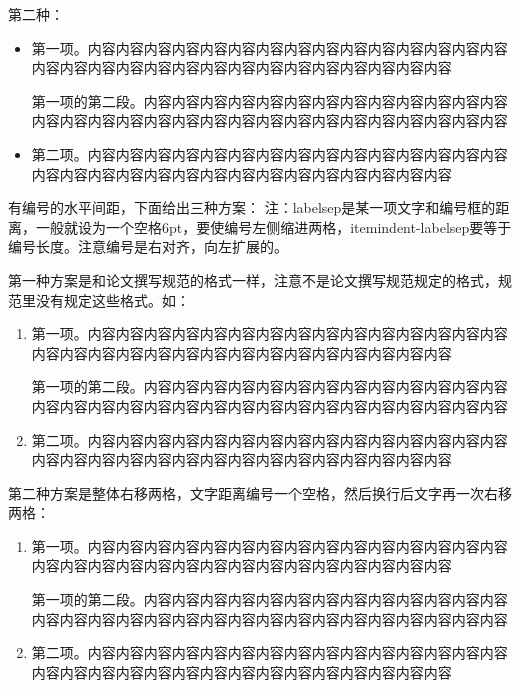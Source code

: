 第二种：
\begin{itemize}[topsep = 0 pt, itemsep= 0 pt, parsep=0pt, partopsep=0pt, leftmargin=36pt, itemindent=0pt, labelsep=6pt, listparindent=24pt]
	\item 第一项。内容内容内容内容内容内容内容内容内容内容内容内容内容内容内容内容内容内容内容内容内容内容内容内容内容内容内容内容内容内容

	第一项的第二段。内容内容内容内容内容内容内容内容内容内容内容内容内容内容内容内容内容内容内容内容内容内容内容内容内容内容内容内容内容内容
	\item 第二项。内容内容内容内容内容内容内容内容内容内容内容内容内容内容内容内容内容内容内容内容内容内容内容内容内容内容内容内容内容内容
	
\end{itemize}

有编号的水平间距，下面给出三种方案：
注：labelsep是某一项文字和编号框的距离，一般就设为一个空格6pt，要使编号左侧缩进两格，itemindent-labelsep要等于编号长度。注意编号是右对齐，向左扩展的。

第一种方案是和论文撰写规范的格式一样，注意不是论文撰写规范规定的格式，规范里没有规定这些格式。如：
\begin{enumerate}[topsep = 0 pt, itemsep= 0 pt, parsep=0pt, partopsep=0pt, leftmargin=0pt, itemindent=44pt, labelsep=6pt, listparindent=24pt, label=(\arabic*)]
	\item 第一项。内容内容内容内容内容内容内容内容内容内容内容内容内容内容内容内容内容内容内容内容内容内容内容内容内容内容内容内容内容内容

	第一项的第二段。内容内容内容内容内容内容内容内容内容内容内容内容内容内容内容内容内容内容内容内容内容内容内容内容内容内容内容内容内容内容
	\item 第二项。内容内容内容内容内容内容内容内容内容内容内容内容内容内容内容内容内容内容内容内容内容内容内容内容内容内容内容内容内容内容
	
\end{enumerate}

第二种方案是整体右移两格，文字距离编号一个空格，然后换行后文字再一次右移两格：
\begin{enumerate}[topsep = 0 pt, itemsep= 0 pt, parsep=0pt, partopsep=0pt, leftmargin=44pt, itemindent=0pt, labelsep=6pt, label=(\arabic*)]
	\item 第一项。内容内容内容内容内容内容内容内容内容内容内容内容内容内容内容内容内容内容内容内容内容内容内容内容内容内容内容内容内容内容

	第一项的第二段。内容内容内容内容内容内容内容内容内容内容内容内容内容内容内容内容内容内容内容内容内容内容内容内容内容内容内容内容内容内容
	\item 第二项。内容内容内容内容内容内容内容内容内容内容内容内容内容内容内容内容内容内容内容内容内容内容内容内容内容内容内容内容内容内容
	
\end{enumerate}

